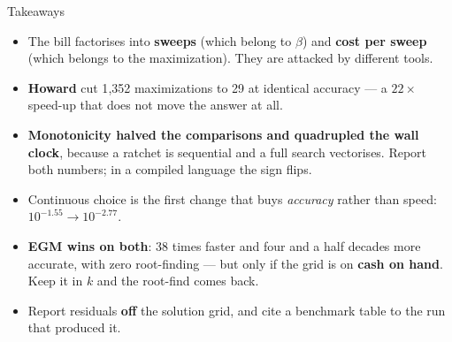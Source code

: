 \begin{frame}{Takeaways}
\begin{takeawaybox}
\begin{itemize}\small
  \item The bill factorises into \textbf{sweeps} (which belong to $\beta$) and \textbf{cost per sweep} (which belongs to the maximization). They are attacked by different tools.
  \item \textbf{Howard} cut 1{,}352 maximizations to 29 at identical accuracy --- a $22\times$ speed-up that does not move the answer at all.
  \item \textbf{Monotonicity halved the comparisons and quadrupled the wall clock}, because a ratchet is sequential and a full search vectorises. Report both numbers; in a compiled language the sign flips.
  \item Continuous choice is the first change that buys \emph{accuracy} rather than speed: $10^{-1.55}\to10^{-2.77}$.
  \item \textbf{EGM wins on both}: 38 times faster and four and a half decades more accurate, with zero root-finding --- but only if the grid is on \textbf{cash on hand}. Keep it in $k$ and the root-find comes back.
  \item Report residuals \textbf{off} the solution grid, and cite a benchmark table to the run that produced it.
\end{itemize}
\end{takeawaybox}
\end{frame}

